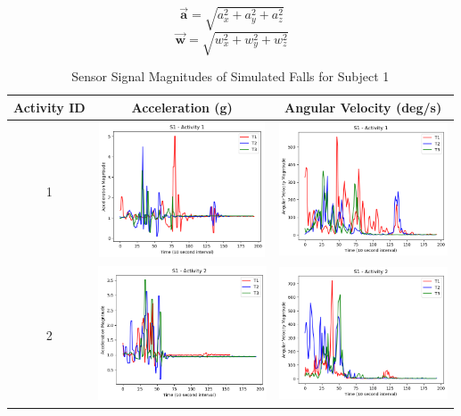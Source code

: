 \documentclass{llncs}
\begin{document}
\begin{equation*}
    	\vec{\mathbf{a}} = \sqrt{a_{x}^2 + a_{y}^2 + a_{z}^2}
\end{equation*} 
\begin{equation*}
	\vec{\mathbf{w}} = \sqrt{w_{x}^2 + w_{y}^2 + w_{z}^2}
\end{equation*} 
	
 \begin{table}
	\begin{center}
		\caption{Sensor Signal Magnitudes of Simulated Falls for Subject 1}
		\label{table3}
		\begin{tabular}{|c|c|c|}
			\toprule
			Activity ID & Acceleration (g) & Angular Velocity (deg/s)\\
			\midrule
			1 & \includegraphics[width=5cm, height=4cm]{images/Acceleration/S1_Activity1.png} & \includegraphics[width=5cm, height=4cm]{images/AngularVelocity/S1_Activity1.png}\\
			\midrule
			2 & \includegraphics[width=5cm, height=4cm]{images/Acceleration/S1_Activity2.png} & \includegraphics[width=5cm, height=4cm]{images/AngularVelocity/S1_Activity2.png}\\

\end{tabular}
\end{center}
\end{table}
\end{document}
